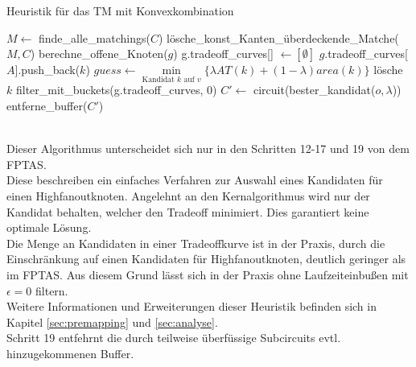 \documentclass[11pt, a4paper, german]{article}
\begin{document}
\LinesNumbered
\begin{algorithm}[H]
\DontPrintSemicolon
\caption{Heuristik f\"ur das TM mit Konvexkombination}

   $M \gets$ finde\_alle\_matchings($C$)\;
   lösche\_konst\_Kanten\_überdeckende\_Matche($M, C$)\;
        {
			berechne\_offene\_Knoten($g$)\;	 
        }
  {
    g.tradeoff\_curves[] $\gets [\emptyset]$\;
    {
      {
        {
        	 {
			$g$.tradeoff\_curves[$A$].push\_back($k$)\;      	 
        	 }  
        }
      }
    }
  {
    $guess \gets \min\limits_{\text{Kandidat }k\text{ auf }v}\{ \lambda AT(k) + (1-\lambda) area(k)  \}$\;
    {
      {
	l\"osche $k$\;
      }
    }
  }    
    filter\_mit\_buckets(g.tradeoff\_curves, 0)\;    
  }
  $C' \gets $ circuit(bester\_kandidat($o, \lambda$))\;
  \Return entferne\_buffer($C'$)\;
\end{algorithm}\ \\

Dieser Algorithmus unterscheidet sich nur in den Schritten 12-17 und 19 von dem FPTAS.\\
Diese beschreiben ein einfaches Verfahren zur Auswahl eines Kandidaten für einen Highfanoutknoten. Angelehnt an den Kernalgorithmus wird nur der Kandidat behalten, welcher den Tradeoff minimiert. Dies garantiert keine optimale Lösung. \\
Die Menge an Kandidaten in einer Tradeoffkurve ist in der Praxis, durch die Einschränkung auf einen Kandidaten für Highfanoutknoten, deutlich geringer als im FPTAS. Aus diesem Grund lässt sich in der Praxis ohne Laufzeiteinbußen mit $\epsilon = 0$ filtern.\\ 
Weitere Informationen und Erweiterungen dieser Heuristik befinden sich in Kapitel \ref{sec:premapping} und \ref{sec:analyse}. \\
Schritt 19 entfehrnt die durch teilweise überfüssige Subcircuits evtl. hinzugekommenen Buffer.\\
\end{document}
